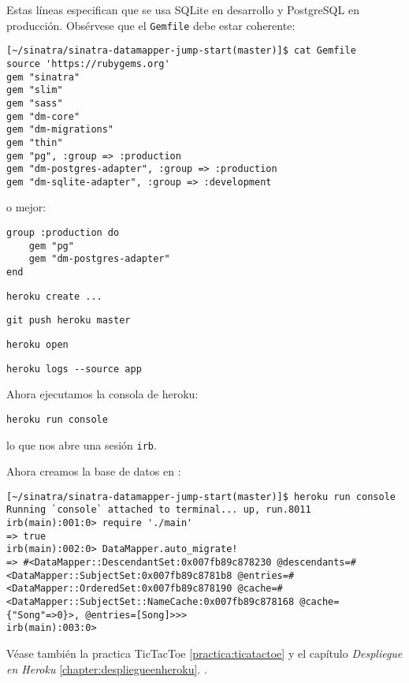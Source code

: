Estas líneas especifican que se usa SQLite en desarrollo y PostgreSQL en producción.
Obsérvese que el \verb|Gemfile| debe estar coherente:
\begin{verbatim}
[~/sinatra/sinatra-datamapper-jump-start(master)]$ cat Gemfile
source 'https://rubygems.org'
gem "sinatra"
gem "slim"
gem "sass"
gem "dm-core"
gem "dm-migrations"
gem "thin"
gem "pg", :group => :production
gem "dm-postgres-adapter", :group => :production
gem "dm-sqlite-adapter", :group => :development
\end{verbatim}
o mejor:
\begin{verbatim}
group :production do
    gem "pg"
    gem "dm-postgres-adapter"
end
\end{verbatim}


\begin{verbatim}
heroku create ...
\end{verbatim}

\begin{verbatim}
git push heroku master
\end{verbatim}

\begin{verbatim}
heroku open
\end{verbatim}

\begin{verbatim}
heroku logs --source app
\end{verbatim}

Ahora ejecutamos la consola de heroku:

\begin{verbatim}
heroku run console
\end{verbatim}
lo que nos abre una sesión \verb|irb|.

Ahora creamos la base de datos en \Heroku{}:
\begin{verbatim}
[~/sinatra/sinatra-datamapper-jump-start(master)]$ heroku run console
Running `console` attached to terminal... up, run.8011
irb(main):001:0> require './main'
=> true
irb(main):002:0> DataMapper.auto_migrate!
=> #<DataMapper::DescendantSet:0x007fb89c878230 @descendants=#<DataMapper::SubjectSet:0x007fb89c8781b8 @entries=#<DataMapper::OrderedSet:0x007fb89c878190 @cache=#<DataMapper::SubjectSet::NameCache:0x007fb89c878168 @cache={"Song"=>0}>, @entries=[Song]>>>
irb(main):003:0> 
\end{verbatim}
Véase también 
la practica TicTacToe
\ref{practica:ticatactoe}
y
el capítulo {\it Despliegue en Heroku} 
\ref{chapter:despliegueenheroku}.
.
